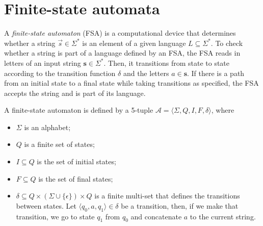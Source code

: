 \section{Finite-state automata} \label{sec:fsa}



A \textit{finite-state automaton} (FSA) is a computational device that
determines whether a string $\vec{s}\in\Sigma^*$ is an element of a given
language $L\subseteq\Sigma^*$. To check whether a string is part of a language
defined by an FSA, the FSA reads in letters of an input string
$\bm{s}\in\Sigma^*$. Then, it transitions from state to state according to the
transition function $\delta$ and the letters $a\in\bm{s}$. If there is a path
from an initial state to a final state while taking transitions as specified,
the FSA accepts the string and is part of its language.


\begin{definition}
  A finite-state automaton is defined by a 5-tuple $\mathcal{A}=\langle \Sigma,
  Q, I, F, \delta \rangle$, where
  \begin{itemize}
    \item $\Sigma$ is an alphabet;
    \item $Q$ is a finite set of states;
    \item $I\subseteq Q$ is the set of initial states;
    \item $F\subseteq Q$ is the set of final states;
    \item $\delta\subseteq Q \times (\Sigma\cup\{\epsilon\}) \times Q$ is a
      finite multi-set that defines the transitions between states. Let
      $\langle q_0,a,q_1 \rangle\in\delta$ be a transition, then, if we make
      that transition, we go to state $q_1$ from $q_0$ and concatenate $a$ to
      the current string.
  \end{itemize}
\end{definition}

